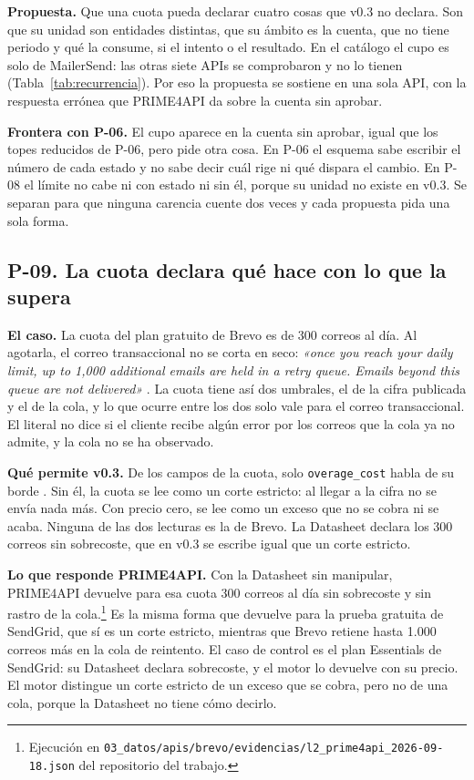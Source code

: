 \textbf{Propuesta.} Que una cuota pueda declarar cuatro cosas que v0.3 no declara.
Son que su unidad son entidades distintas, que su ámbito es la cuenta, que no tiene periodo y qué la consume, si el intento o el resultado.
En el catálogo el cupo es solo de MailerSend: las otras siete APIs se comprobaron y no lo tienen (Tabla~\ref{tab:recurrencia}).
Por eso la propuesta se sostiene en una sola API, con la respuesta errónea que PRIME4API da sobre la cuenta sin aprobar.

\textbf{Frontera con P-06.} El cupo aparece en la cuenta sin aprobar, igual que los topes reducidos de P-06, pero pide otra cosa.
En P-06 el esquema sabe escribir el número de cada estado y no sabe decir cuál rige ni qué dispara el cambio.
En P-08 el límite no cabe ni con estado ni sin él, porque su unidad no existe en v0.3.
Se separan para que ninguna carencia cuente dos veces y cada propuesta pida una sola forma.

\subsection{P-09. La cuota declara qué hace con lo que la supera}
\label{subsec:evolucion:p09}

\textbf{El caso.} La cuota del plan gratuito de Brevo es de 300 correos al día.
Al agotarla, el correo transaccional no se corta en seco: \textit{«once you reach your daily limit, up to 1,000 additional emails are held in a retry queue. Emails beyond this queue are not delivered»} \citep{brevohelpfree}.
La cuota tiene así dos umbrales, el de la cifra publicada y el de la cola, y lo que ocurre entre los dos solo vale para el correo transaccional.
El literal no dice si el cliente recibe algún error por los correos que la cola ya no admite, y la cola no se ha observado.

\textbf{Qué permite v0.3.} De los campos de la cuota, solo \texttt{overage\_cost} habla de su borde \citep{apisconsumptionmodel}.
Sin él, la cuota se lee como un corte estricto: al llegar a la cifra no se envía nada más.
Con precio cero, se lee como un exceso que no se cobra ni se acaba.
Ninguna de las dos lecturas es la de Brevo.
La Datasheet declara los 300 correos sin sobrecoste, que en v0.3 se escribe igual que un corte estricto.

\textbf{Lo que responde PRIME4API.} Con la Datasheet sin manipular, PRIME4API devuelve para esa cuota 300 correos al día sin sobrecoste y sin rastro de la cola.\footnote{Ejecución en \texttt{03\_datos/apis/brevo/evidencias/l2\_prime4api\_2026-09-18.json} del repositorio del trabajo.}
Es la misma forma que devuelve para la prueba gratuita de SendGrid, que sí es un corte estricto, mientras que Brevo retiene hasta 1.000 correos más en la cola de reintento.
El caso de control es el plan Essentials de SendGrid: su Datasheet declara sobrecoste, y el motor lo devuelve con su precio.
El motor distingue un corte estricto de un exceso que se cobra, pero no de una cola, porque la Datasheet no tiene cómo decirlo.

